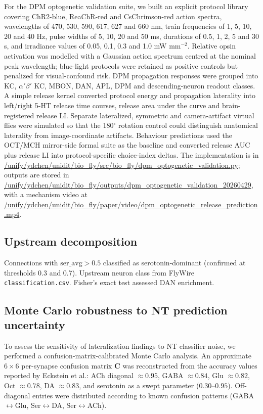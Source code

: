 \documentclass[10pt]{article}
\begin{document}
For the DPM optogenetic validation suite, we built an explicit protocol library covering ChR2-blue, ReaChR-red and CsChrimson-red action spectra, wavelengths of 470, 530, 590, 617, 627 and 660 nm, train frequencies of 1, 5, 10, 20 and 40 Hz, pulse widths of 5, 10, 20 and 50 ms, durations of 0.5, 1, 2, 5 and 30 s, and irradiance values of 0.05, 0.1, 0.3 and 1.0 mW mm$^{-2}$. Relative opsin activation was modelled with a Gaussian action spectrum centred at the nominal peak wavelength; blue-light protocols were retained as positive controls but penalized for visual-confound risk. DPM propagation responses were grouped into KC, $\alpha'\beta'$ KC, MBON, DAN, APL, DPM and descending-neuron readout classes. A simple release kernel converted protocol energy and propagation laterality into left/right 5-HT release time courses, release area under the curve and brain-registered release LI. Separate lateralized, symmetric and camera-artifact virtual flies were simulated so that the 180$^\circ$ rotation control could distinguish anatomical laterality from image-coordinate artifacts. Behaviour predictions used the OCT/MCH mirror-side formal suite as the baseline and converted release AUC plus release LI into protocol-specific choice-index deltas. The implementation is in \url{/unify/ydchen/unidit/bio_fly/src/bio_fly/dpm_optogenetic_validation.py}; outputs are stored in \url{/unify/ydchen/unidit/bio_fly/outputs/dpm_optogenetic_validation_20260429}, with a mechanism video at \url{/unify/ydchen/unidit/bio_fly/paper/video/dpm_optogenetic_release_prediction.mp4}.

\subsection*{Upstream decomposition}
Connections with $\mathrm{ser\_avg} > 0.5$ classified as serotonin-dominant (confirmed at thresholds 0.3 and 0.7). Upstream neuron class from FlyWire \texttt{classification.csv}. Fisher's exact test assessed DAN enrichment.

\subsection*{Monte Carlo robustness to NT prediction uncertainty}
To assess the sensitivity of lateralization findings to NT classifier noise, we performed a confusion-matrix-calibrated Monte Carlo analysis. An approximate $6 \times 6$ per-synapse confusion matrix $\mathbf{C}$ was reconstructed from the accuracy values reported by Eckstein et al.\cite{eckstein2020neurotransmitter}: ACh diagonal $\approx 0.95$, GABA $\approx 0.84$, Glu $\approx 0.82$, Oct $\approx 0.78$, DA $\approx 0.83$, and serotonin as a swept parameter ($0.30$--$0.95$). Off-diagonal entries were distributed according to known confusion patterns (GABA$\leftrightarrow$Glu, Ser$\leftrightarrow$DA, Ser$\leftrightarrow$ACh).
\end{document}

